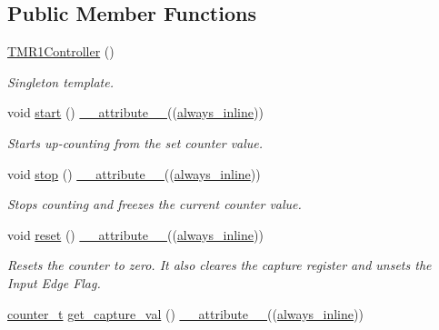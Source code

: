 \subsection*{Public Member Functions}
\begin{DoxyCompactItemize}
\item 
\hyperlink{classTMR1Controller_aebc677e795f673c6520d5a03eb6aa4f2}{T\+M\+R1\+Controller} ()
\begin{DoxyCompactList}\small\item\em Singleton template. \end{DoxyCompactList}\item 
void \hyperlink{classTMR1Controller_a67bc04f0648176a681f6ac01ea483db9}{start} () \hyperlink{utilities_8hpp_a103d5b3998e0dd804213c8f30a094f4d}{\+\_\+\+\_\+attribute\+\_\+\+\_\+}((\hyperlink{classTMR1Controller_adce8e8a496510485a88ccc5b88595672}{always\+\_\+inline}))
\begin{DoxyCompactList}\small\item\em Starts up-\/counting from the set counter value. \end{DoxyCompactList}\item 
void \hyperlink{classTMR1Controller_afcb0ea27107bfbe50b9dcbd54207dd00}{stop} () \hyperlink{utilities_8hpp_a103d5b3998e0dd804213c8f30a094f4d}{\+\_\+\+\_\+attribute\+\_\+\+\_\+}((\hyperlink{classTMR1Controller_adce8e8a496510485a88ccc5b88595672}{always\+\_\+inline}))
\begin{DoxyCompactList}\small\item\em Stops counting and freezes the current counter value. \end{DoxyCompactList}\item 
void \hyperlink{classTMR1Controller_adf3746ffd24c5b55abff4fa18e05f6b3}{reset} () \hyperlink{utilities_8hpp_a103d5b3998e0dd804213c8f30a094f4d}{\+\_\+\+\_\+attribute\+\_\+\+\_\+}((\hyperlink{classTMR1Controller_adce8e8a496510485a88ccc5b88595672}{always\+\_\+inline}))
\begin{DoxyCompactList}\small\item\em Resets the counter to zero. It also cleares the capture register and unsets the Input Edge Flag. \end{DoxyCompactList}\item 
\hyperlink{types_8hpp_ac89ac912f524b3e3fa3720ea55fec966}{counter\+\_\+t} \hyperlink{classTMR1Controller_a3d07eed72365e7a7b44fadefb23b9ba6}{get\+\_\+capture\+\_\+val} () \hyperlink{utilities_8hpp_a103d5b3998e0dd804213c8f30a094f4d}{\+\_\+\+\_\+attribute\+\_\+\+\_\+}((\hyperlink{classTMR1Controller_adce8e8a496510485a88ccc5b88595672}{always\+\_\+inline}))

\end{DoxyCompactItemize}
